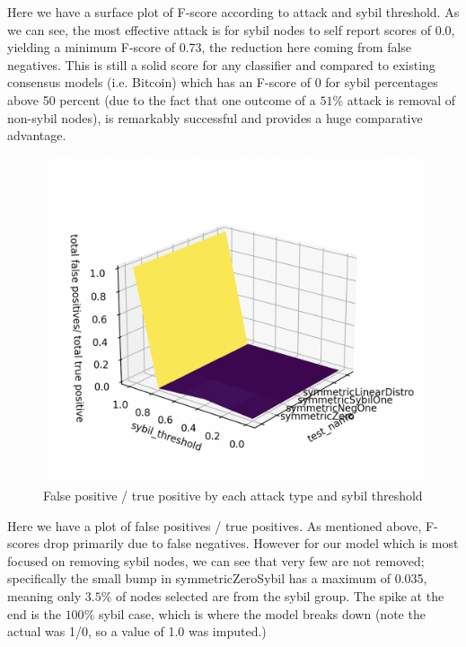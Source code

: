 \documentclass{article}
\begin{document}
Here we have a surface plot of F-score according to attack and sybil threshold. As we can see, the most effective attack is for sybil nodes to self report scores of 0.0, yielding a minimum F-score of 0.73, the reduction here coming from false negatives. This is still a solid score for any classifier and compared to existing consensus models (i.e. Bitcoin) which has an F-score of 0 for sybil percentages above 50 percent (due to the fact that one outcome of a $51\%$ attack is removal of non-sybil nodes), is remarkably successful and provides a huge comparative advantage.


\begin{figure}
\centering
\includegraphics[width=\textwidth, height=\textwidth]{false-pos-vs-true-pos}
\caption{False positive / true positive by each attack type and sybil threshold}
\end{figure}

Here we have a plot of false positives / true positives. As mentioned above, F-scores drop primarily due to false negatives. However for our model which is most focused on removing sybil nodes, we can see that very few are not removed; specifically the small bump in symmetricZeroSybil has a maximum of 0.035, meaning only $3.5\%$ of nodes selected are from the sybil group. The spike at the end is the $100\%$ sybil case, which is where the model breaks down (note the actual was 1/0, so a value of 1.0 was imputed.)
\end{document}
